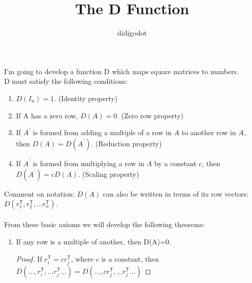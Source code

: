 \documentclass[11pt]{article} %
\title{The D Function}
\author{didigodot}
\begin{document}
\maketitle
I'm going to develop a function D which maps square matrices to numbers.\\
D must satisfy the following conditions:\\
\begin{enumerate}
	\item $D(I_n)=1$. (Identity property)
	\item If A has a zero row, $D(A)=0$. (Zero row property)
	\item If $A^\prime$ is formed from adding a multiple of a row in $A$ to another row in $A$, then $D(A)=D(A^\prime)$. (Reduction property)
	\item If $A^\prime$ is formed from multiplying a row in $A$ by a constant $c$, then $D(A^\prime)=c D(A)$. (Scaling property)
\end{enumerate}
Comment on notation: $D(A)$ can also be written in terms of its row vectors: $D(r^{\mathsf{T}}_1,r^{\mathsf{T}}_2,\dots r^{\mathsf{T}}_n ).$\\ \\
From these basic axioms we will develop the following theorems:
\begin{enumerate}
	\item If any row is a multiple of another, then D(A)=0. 
	  		\begin{proof}
		If $r^{\mathsf{T}}_i=cr^{\mathsf{T}}_j$, where $c$ is a constant, then $D(\dots, r^{\mathsf{T}}_i, \dots r^{\mathsf{T}}_j\dots)=D(\dots,cr^{\mathsf{T}}_j,\dots r^{\mathsf{T}}_j \dots)$
		\end{proof}
\end{enumerate}
\end{document}
